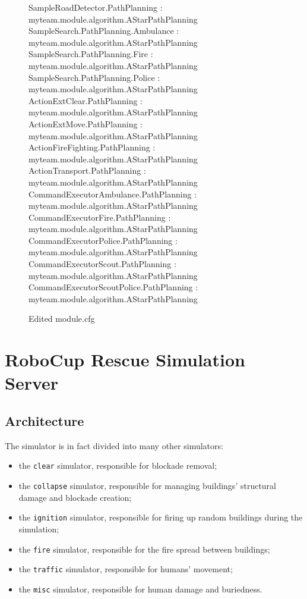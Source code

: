 \documentclass{article}
\begin{document}
\begin{figure}[ht]
 \begin{center}
\begin{screen}
{\ttfamily
SampleRoadDetector.PathPlanning : myteam.module.algorithm.AStarPathPlanning\\
SampleSearch.PathPlanning.Ambulance : myteam.module.algorithm.AStarPathPlanning\\
SampleSearch.PathPlanning.Fire : myteam.module.algorithm.AStarPathPlanning\\
SampleSearch.PathPlanning.Police : myteam.module.algorithm.AStarPathPlanning\\
ActionExtClear.PathPlanning : myteam.module.algorithm.AStarPathPlanning\\
ActionExtMove.PathPlanning : myteam.module.algorithm.AStarPathPlanning\\
ActionFireFighting.PathPlanning : myteam.module.algorithm.AStarPathPlanning\\
ActionTransport.PathPlanning : myteam.module.algorithm.AStarPathPlanning\\
CommandExecutorAmbulance.PathPlanning : myteam.module.algorithm.AStarPathPlanning\\
CommandExecutorFire.PathPlanning : myteam.module.algorithm.AStarPathPlanning\\
CommandExecutorPolice.PathPlanning : myteam.module.algorithm.AStarPathPlanning\\
CommandExecutorScout.PathPlanning : myteam.module.algorithm.AStarPathPlanning\\
CommandExecutorScoutPolice.PathPlanning : myteam.module.algorithm.AStarPathPlanning
}
\end{screen}
  \caption{Edited module.cfg}
  \label{fig:edited_module.cfg}
 \end{center}
\end{figure}
\section{RoboCup Rescue Simulation Server}
\subsection{Architecture}
The simulator is in fact divided into many other simulators:
\begin{itemize}
  \item the \texttt{clear} simulator, responsible for blockade removal;
  \item the \texttt{collapse} simulator, responsible for managing buildings' structural damage and blockade creation;
  \item the \texttt{ignition} simulator, responsible for firing up random buildings during the simulation;
  \item the \texttt{fire} simulator, responsible for the fire spread between buildings;
  \item the \texttt{traffic} simulator, responsible for humans' movement;
  \item the \texttt{misc} simulator, responsible for human damage and buriedness.
\end{itemize}
\end{document}

